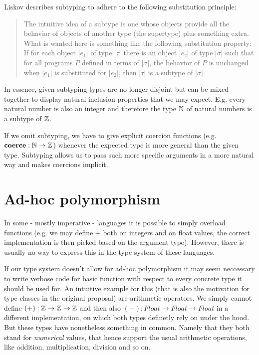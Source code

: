 
Liskov \cite{liskov} describes subtyping to adhere to the following substitution principle:

\begin{quote}
The intuitive idea of a subtype is one whose objects provide all the behavior of objects of another type (the supertype) plus something extra.
What is wanted here is something like the following substitution property:
If for each object [$e_1$] of type [$\tau$] there is an object [$e_2$] of type [$\sigma$] such that for all programs $P$ defined in terms of [$\sigma$],
the behavior of $P$ is unchanged when [$e_1$] is substituted for [$e_2$], then [$\tau$] is a subtype of [$\sigma$].
\end{quote}

In essence, given subtyping types are no longer disjoint but can be mixed together to display natural inclusion properties that we may expect.
E.g. every natural number is also an integer and therefore the type $\mathbb{N}$ of natural numbers is a subtype of $\mathbb{Z}$.

If we omit subtyping, we have to give explicit coercion functions (e.g. $\mathbf{coerce} : \mathbb{N} \to \mathbb{Z}$) whenever the expected type is more general than the given type.
Subtyping allows us to pass such more specific arguments in a more natural way and makes coercions implicit.

\section{Ad-hoc polymorphism}\label{sec:ad-hoc-polymorphism}

In some - mostly imperative - languages it is possible to simply overload functions (e.g. we may define $+$ both on integers and on float values, the correct implementation is then picked based on the argument type).
However, there is usually no way to express this in the type system of these languages. %

If our type system doesn't allow for ad-hoc polymorphism it may seem neccessary to write verbose code for basic function with respect to every concrete type it should be used for.
An intuitive example for this (that is also the motivation for type classes in the original proposal) are arithmetic operators.
We simply cannot define $(+) : \mathbb{Z} \to \mathbb{Z} \to \mathbb{Z}$ and then also $(+) : \mathit{Float} \to \mathit{Float} \to \mathit{Float}$ in a different implementation, on which both types definetly rely on under the hood.
But these types have nonetheless something in common. Namely that they both stand for \emph{numerical} values, that hence support the usual arithmetic operations, like addition, multiplication, division and so on.

